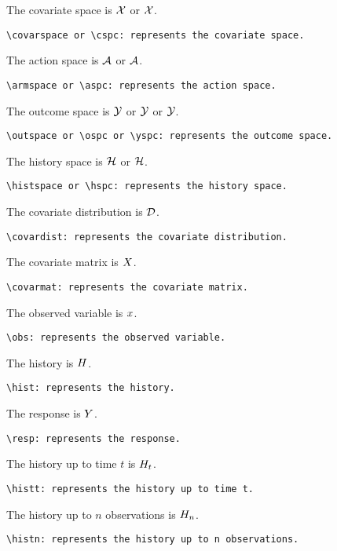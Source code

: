 \documentclass{article}
\begin{document}
The covariate space is $\mathcal{X}$ or $\mathcal{X}$.
\begin{verbatim}
\covarspace or \cspc: represents the covariate space.
\end{verbatim}

The action space is $\mathcal{A}$ or $\mathcal{A}$.
\begin{verbatim}
\armspace or \aspc: represents the action space.
\end{verbatim}

The outcome space is $\mathcal{Y}$ or $\mathcal{Y}$ or $\mathcal{Y}$.
\begin{verbatim}
\outspace or \ospc or \yspc: represents the outcome space.
\end{verbatim}

The history space is $\mathcal{H}$ or $\mathcal{H}$.
\begin{verbatim}
\histspace or \hspc: represents the history space.
\end{verbatim}

The covariate distribution is $\mathcal{D}$.
\begin{verbatim}
\covardist: represents the covariate distribution.
\end{verbatim}

The covariate matrix is $X$.
\begin{verbatim}
\covarmat: represents the covariate matrix.
\end{verbatim}

The observed variable is $x$.
\begin{verbatim}
\obs: represents the observed variable.
\end{verbatim}

The history is $H$.
\begin{verbatim}
\hist: represents the history.
\end{verbatim}

The response is $Y$.
\begin{verbatim}
\resp: represents the response.
\end{verbatim}

The history up to time $t$ is $H_t$.
\begin{verbatim}
\histt: represents the history up to time t.
\end{verbatim}

The history up to $n$ observations is $H_n$.
\begin{verbatim}
\histn: represents the history up to n observations.
\end{verbatim}
\end{document}
